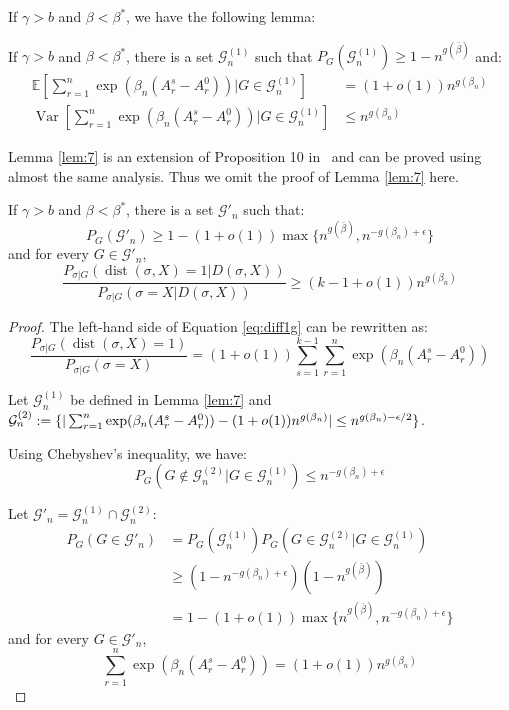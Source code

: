 \documentclass[entropy,article,accept,moreauthors,pdftex]{Definitions/mdpi}
\newcommand{\cG}{\mathcal{G}}
\newcommand{\1}{\mathbbm{1}}
\DeclareMathOperator{\Var}{Var}
\DeclareMathOperator{\Dist}{dist}
\begin{document}
\begin{paracol}{2}
If $\gamma > b$ and $\beta < \beta^*$, we have the following lemma:
\begin{Lemma}\label{lem:7}
	If $\gamma > b$ and $\beta < \beta^*$, there is a set $\cG^{(1)}_n$ such that
	$P_G(\cG^{(1)}_n) \geq 1-n^{g(\bar{\beta})}$
	and:
\begin{align}
	\mathbb{E}[\sum_{r=1}^n \exp(\beta_n (A_r^s - A_r^0)) | G \in \cG^{(1)}_n] &= (1+o(1))n^{g(\beta_n)} \\
	\Var[\sum_{r=1}^n \exp(\beta_n (A_r^s - A_r^0)) | G \in \cG^{(1)}_n] &\leq n^{g(\beta_n)}
	\end{align}
\end{Lemma}
Lemma \ref{lem:7} is an extension of Proposition 10 in~\cite{ye2020exact} and can be proved using almost the same analysis. Thus we omit the
proof of Lemma \ref{lem:7} here.
\begin{Lemma}\label{prop:large2}
	If $\gamma > b$ and $\beta < \beta^*$, there is a set $\cG'_n$ such that:
\begin{equation}
	P_G(\cG'_n) \geq 1 - (1+o(1))\max\{n^{g(\bar{\beta})}, n^{ - g(\beta_n) + \epsilon} \}
	\end{equation}
	and for every $G \in \cG'_n$,
\begin{equation}\label{eq:diff1g}
	\frac{P_{\sigma|G}(\Dist(\sigma, X)=1 | D(\sigma, X))}
	{P_{\sigma|G}(\sigma=X | D(\sigma, X))} \geq (k-1+o(1))n^{g(\beta_n)}
	\end{equation}
	
\end{Lemma}
\begin{proof}
The left-hand side of Equation \eqref{eq:diff1g} can be rewritten as:
\begin{equation}\label{eq:knd}
	\frac{P_{\sigma|G}(\Dist(\sigma, X)=1)}
{P_{\sigma|G}(\sigma=X)}= (1+o(1))\sum_{s=1}^{k-1}\sum_{r=1}^n \exp(\beta_n (A_r^s - A_r^0))
\end{equation}

Let $\cG^{(1)}_n$ be defined in Lemma \ref{lem:7}
and $\cG^{(2)}_n: = \{|\sum_{r=1}^n \exp(\beta_n (A_r^s - A_r^0)) -\linebreak (1+o(1))n^{g(\beta_n)}  | \leq n^{g(\beta_n) - \epsilon / 2} \}$.

Using Chebyshev's inequality, we have:
\begin{equation*}
P_G(G \not\in \cG^{(2)}_n \Big\vert  G \in \cG^{(1)}_n) \leq n^{- g(\beta_n) + \epsilon}
\end{equation*}

Let $\cG'_n = \cG^{(1)}_n \cap \cG^{(2)}_n$:
\begin{align*}
P_G(G \in \cG'_n) &= P_G(\cG^{(1)}_n) P_G(G \in \cG_n^{(2)} | G \in \cG_n^{(1)}) \\
& \geq (1-n^{ - g(\beta_n) + \epsilon})(1-n^{g(\bar{\beta})}) \\
&= 1-(1+o(1))\max\{n^{g(\bar{\beta})}, n^{- g(\beta_n) + \epsilon} \}
\end{align*}
and for every $G\in\cG'_n$,
\begin{equation*}
\sum_{r=1}^n \exp(\beta_n (A_r^s - A_r^0)) = (1+o(1)) n^{g(\beta_n)}
\end{equation*}


\end{proof}
\end{paracol}
\end{document}

